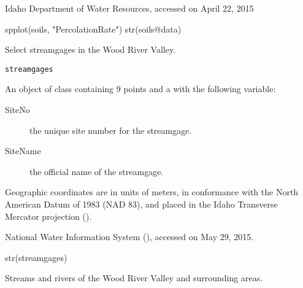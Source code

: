 \documentclass[letterpaper]{book}
\begin{document}
%
\begin{Source}\relax
Idaho Department of Water Resources, accessed on April 22, 2015
\end{Source}
%
\begin{Examples}
\begin{ExampleCode}
spplot(soils, "PercolationRate")
str(soils@data)
\end{ExampleCode}
\end{Examples}
%
\begin{Description}\relax
Select streamgages in the Wood River Valley.
\end{Description}
%
\begin{Usage}
\begin{verbatim}
streamgages
\end{verbatim}
\end{Usage}
%
\begin{Format}
An object of  class containing 9 points and a  with the following variable:
\begin{description}

\item[SiteNo] the unique site number for the streamgage.
\item[SiteName] the official name of the streamgage.

\end{description}

Geographic coordinates are in units of meters, in conformance with the North American Datum of 1983 (NAD 83), and placed in the
Idaho Transverse Mercator projection ().
\end{Format}
%
\begin{Source}\relax
National Water Information System (), accessed on May 29, 2015.
\end{Source}
%
\begin{Examples}
\begin{ExampleCode}
str(streamgages)
\end{ExampleCode}
\end{Examples}
%
\begin{Description}\relax
Streams and rivers of the Wood River Valley and surrounding areas.
\end{Description}
\end{document}
